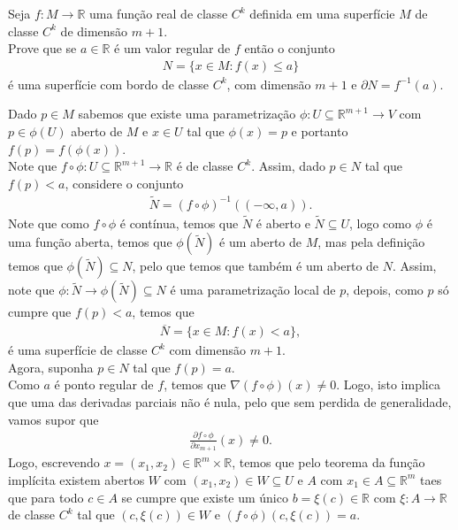 \begin{homeworkProblem}[Seção 2-3]
  Seja $f:M\longrightarrow\mathbb{R}$ uma função real de classe $C^{k}$ definida em uma superfície $M$ de classe $C^{k}$ de dimensão $m+1$.\\
  Prove que se $a\in\mathbb{R}$ é um valor regular de $f$ então o conjunto
  \begin{align*}
    N=\{x\in M: f(x)\le a\}
  \end{align*}
  é uma superfície com bordo de classe $C^{k}$, com dimensão $m+1$ e $\partial N=f^{-1}(a)$.
  \begin{solution}
    Dado $p\in M$ sabemos que existe uma parametrização $\phi:U\subseteq\mathbb{R}^{m+1}\to V$ com $p\in \phi(U)$ aberto de $M$ e $x\in U$ tal que $\phi(x)=p$ e portanto $f(p)=f(\phi(x))$.\\
    Note que $f\circ\phi: U\subseteq\mathbb{R}^{m+1}\to\mathbb{R}$ é de classe $C^{k}$. Assim, dado $p\in N$ tal que $f(p)<a$, considere o conjunto
    \begin{align*}
      \tilde{N}=(f\circ\phi)^{-1}((-\infty,a)).
    \end{align*}
    Note que como $f\circ\phi$ é contínua, temos que $\tilde{N}$ é aberto e $\tilde{N}\subseteq U$, logo como $\phi$ é uma função aberta, temos que $\phi(\tilde{N})$ é um aberto de $M$, mas pela definição temos que $\phi(\tilde{N})\subseteq N$, pelo que temos que também é um aberto de $N$. Assim, note que $\phi:\tilde{N}\to \phi(\tilde{N})\subseteq N$ é uma parametrização local de $p$, depois, como $p$ só cumpre que $f(p)<a$, temos que
    \begin{align*}
      \overline{N}=\{x\in M:f(x)<a\},
    \end{align*}
    é uma superfície de classe $C^{k}$ com dimensão $m+1$.\\
    Agora, suponha $p\in N$ tal que $f(p)=a$.\\
    Como $a$ é ponto regular de $f$, temos que $\nabla(f\circ \phi)(x)\neq 0$. Logo, isto implica que uma das derivadas parciais não é nula, pelo que sem perdida de generalidade, vamos supor que 
    \begin{align*}
      \frac{\partial f\circ \phi}{\partial x_{m+1}}(x)\neq 0.
    \end{align*}
    Logo, escrevendo $x=(x_1,x_2)\in\mathbb{R}^{m}\times\mathbb{R}$, temos que pelo teorema da função implícita existem abertos $W$ com $(x_1,x_2)\in W\subseteq U$ e $A$ com $x_1\in A\subseteq\mathbb{R}^{m}$ taes que para todo $c\in A$ se cumpre que existe um único $b=\xi(c)\in\mathbb{R}$ com $\xi:A\to\mathbb{R}$ de classe $C^{k}$ tal que $(c,\xi(c))\in W$ e $(f\circ\phi)(c,\xi(c))=a$.\\

\end{solution}
\end{homeworkProblem}
